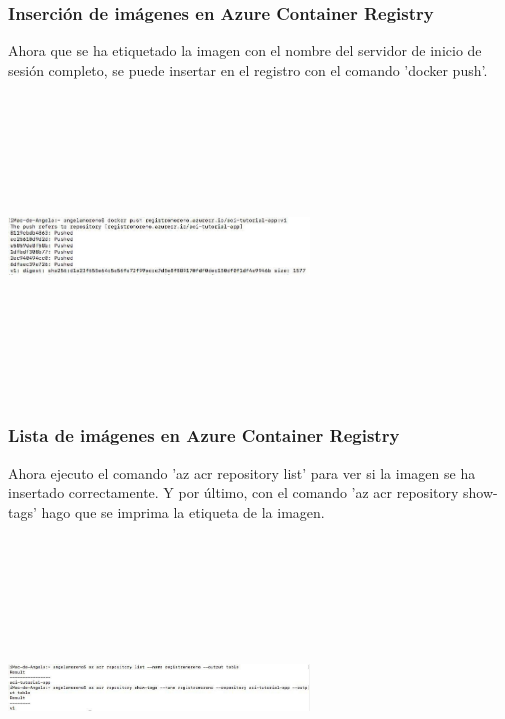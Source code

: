 \documentclass[english,runningheads,a4paper]{llncs}[2018/03/10]
\newenvironment{nscenter}
 {\parskip=0pt\par\nopagebreak\centering}
 {\par\noindent\ignorespacesafterend}
\begin{document}
\subsubsection*{Inserción de imágenes en Azure Container Registry}
Ahora que se ha etiquetado la imagen con el nombre del servidor de inicio de 
sesión completo, se puede insertar en el registro con el comando 'docker push'.
\newline
\begin{nscenter}
\includegraphics[width=8cm,height=8cm,keepaspectratio]{./Contenedores/Azure/20.jpg}
\end{nscenter}
\subsubsection*{Lista de imágenes en Azure Container Registry}
Ahora ejecuto el comando 'az acr repository list' para ver si la imagen se ha 
insertado correctamente. Y por último, con el comando 'az acr repository 
show-tags' hago que se imprima la etiqueta de la imagen.
\newline
\begin{nscenter}
\includegraphics[width=8cm,height=8cm,keepaspectratio]{./Contenedores/Azure/21.jpg}
\end{nscenter}
\newpage
\end{document}
